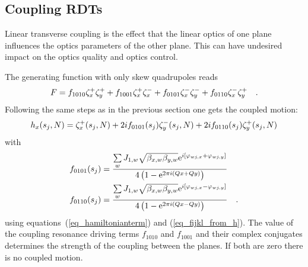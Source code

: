 
\subsection{Coupling RDTs}
\label{sec_coupling_rdts}

Linear transverse coupling is the effect that the linear optics of one plane influences the optics
parameters of the other plane. This can have undesired impact on the optics quality and optics
control.

The generating function with only skew quadrupoles reads
%
\begin{equation}
    F = f_{1010} \zeta_x^+ \zeta_y^+  + f_{1001} \zeta_x^+ \zeta_x^- + f_{0101} \zeta_x^- \zeta_y^- + f_{0110} \zeta_x^- \zeta_y^+
    \quad .
\end{equation}
%
Following the same steps as in the previous section one gets the coupled motion:
%
\begin{equation}
    h_x(s_j,N) = \zeta_x^+(s_j,N) + 2i f_{0101}(s_j) \zeta_y^-(s_j,N) + 2i f_{0110}(s_j) \zeta_y^+(s_j,N)
    \label{eq_coupled_h_from_z}
\end{equation}
%
with
%
\begin{align}
    f_{0101}(s_j) &= \frac{
        \sum\limits_w J_{1,w} \sqrt{\beta_{x,w}\beta_{y,w}}\text{e}^{i\left[\varphi_{wj,x} + \varphi_{wj,y}\right]}
    }{
        4\left( 1- \text{e}^{2\pi i (Qx+Qy)} \right)
    } \notag \\
    f_{0110}(s_j) &= \frac{
        \sum\limits_w J_{1,w} \sqrt{\beta_{x,w}\beta_{y,w}}\text{e}^{i\left[\varphi_{wj,x} - \varphi_{wj,y}\right]}
    }{
        4\left( 1- \text{e}^{2\pi i (Qx-Qy)} \right)
    }
    \quad .
    \label{eq_f0101_f0110}
\end{align}
%
using equations~(\ref{eq_hamiltonianterm}) and (\ref{eq_fijkl_from_h}).
The value of the coupling resonance driving terms $f_{1010}$ and $f_{1001}$ and their complex conjugates
determines the strength of the coupling between the planes. 
If both are zero there is no coupled motion.

